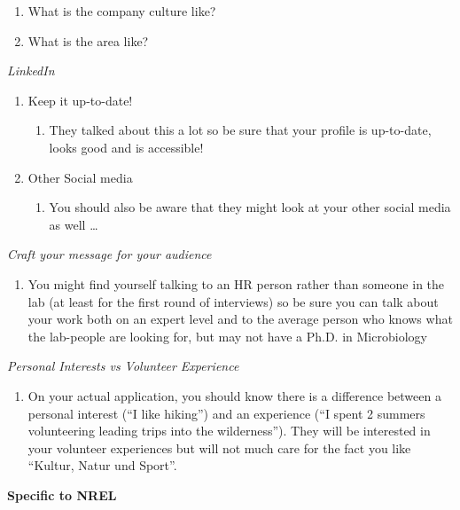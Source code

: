 \documentclass[12pt]{article}
\begin{document}
\begin{spacing}{1.5}
\begin{enumerate}
\begin{enumerate}
\begin{enumerate}
        				 \item What is the company culture like?
        				 \item What is the area like?
       			\end{enumerate}
     			{\large \item \emph{LinkedIn}}
    				 \begin{enumerate}
         				\item Keep it up-to-date! 
         					\begin{enumerate}
         					\item[] They talked about this a lot so be sure that your profile is up-to-date, looks good and is accessible!
         					\end{enumerate}
         				\item Other Social media
         					\begin{enumerate}
         					\item[] You should also be aware that they might look at your other social media as well \dots
         					\end{enumerate}
      				 \end{enumerate}
     			{\large \item \emph{Craft your message for your audience}}
     				\begin{enumerate}
        				 \item[] You might find yourself talking to an HR person rather than someone in the lab (at least for the first round of interviews) so be sure you can talk about your work both on an expert level and to the average person who knows what the lab-people are looking for, but may not have a Ph.D. in Microbiology
      				 \end{enumerate}
     			{\large \item \emph{Personal Interests vs Volunteer Experience}}
     				\begin{enumerate}
				         \item[] On your actual application, you should know there is a difference between a personal interest (``I like hiking'') and an experience (``I spent 2 summers volunteering leading trips into the wilderness''). They will be interested in your volunteer experiences but will not much care for the fact you like ``Kultur, Natur und Sport''.
			       \end{enumerate}
		       \end{enumerate}
		{\LARGE \item \textbf{Specific to NREL}}

\end{enumerate}
\end{spacing}
\end{document}
